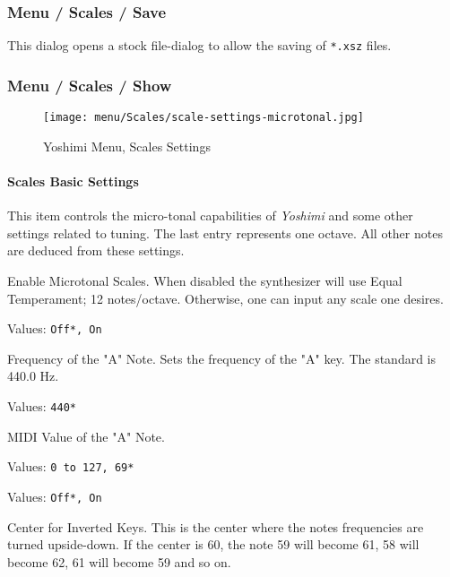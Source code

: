 \subsubsection{Menu / Scales / Save}
\label{subsec:menu_scales_save}

   This dialog opens a stock file-dialog to allow the saving of
   \texttt{*.xsz} files.

\subsubsection{Menu / Scales / Show}
\label{subsec:menu_scales_show}

\begin{figure}[H]
   \centering 
   \texttt{[image: menu/Scales/scale-settings-microtonal.jpg]}
   \caption{Yoshimi Menu, Scales Settings}
   \label{fig:yoshimi_menu_scales_settings}
\end{figure}

\paragraph{Scales Basic Settings}
\label{paragraph:menu_scales_basic_settings}

   This item controls the micro-tonal capabilities of \textsl{Yoshimi} and
   some other settings related to tuning. 
   The last entry represents one octave. All other notes are deduced from
   these settings.

   \setcounter{ItemCounter}{0}      %

   Enable Microtonal Scales.
   When disabled the synthesizer will use Equal Temperament; 12 notes/octave.
   Otherwise, one can input any scale one desires.

   Values: \texttt{Off*, On}

   Frequency of the "A" Note.
   Sets the frequency of the "A" key. The standard is 440.0 Hz.

   Values: \texttt{440*}

   MIDI Value of the "A" Note.

   Values: \texttt{0 to 127, 69*}


   Values: \texttt{Off*, On}

   Center for Inverted Keys.
   This is the center where the notes frequencies are turned upside-down.
   If the center is 60, the note 59 will become 61, 58 will become 62, 61
   will become 59 and so on.

